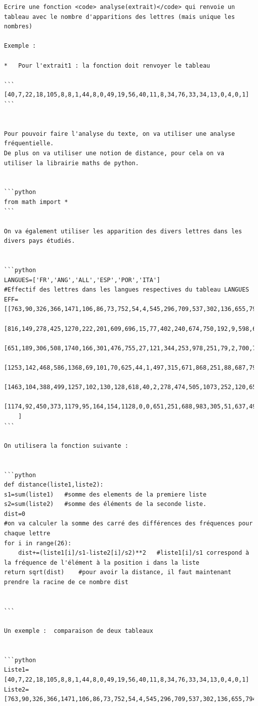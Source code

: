 \documentclass[
]{article}
\begin{document}
\begin{verbatim}
Ecrire une fonction <code> analyse(extrait)</code> qui renvoie un tableau avec le nombre d'apparitions des lettres (mais unique les nombres)

Exemple : 

*   Pour l'extrait1 : la fonction doit renvoyer le tableau   

```
[40,7,22,18,105,8,8,1,44,8,0,49,19,56,40,11,8,34,76,33,34,13,0,4,0,1]
```


Pour pouvoir faire l'analyse du texte, on va utiliser une analyse fréquentielle.  
De plus on va utiliser une notion de distance, pour cela on va utiliser la librairie maths de python.


```python
from math import *
```

On va également utiliser les apparition des divers lettres dans les divers pays étudiés.


```python
LANGUES=['FR','ANG','ALL','ESP','POR','ITA']
#Effectif des lettres dans les langues respectives du tableau LANGUES
EFF=[[763,90,326,366,1471,106,86,73,752,54,4,545,296,709,537,302,136,655,794,724,631,162,11,38,30,13],
    [816,149,278,425,1270,222,201,609,696,15,77,402,240,674,750,192,9,598,632,905,275,97,236,15,197,7],
    [651,189,306,508,1740,166,301,476,755,27,121,344,253,978,251,79,2,700,727,615,435,67,189,3,4,113],
    [1253,142,468,586,1368,69,101,70,625,44,1,497,315,671,868,251,88,687,798,463,393,90,2,22,90,52],
    [1463,104,388,499,1257,102,130,128,618,40,2,278,474,505,1073,252,120,653,781,474,463,167,1,21,1,47],
    [1174,92,450,373,1179,95,164,154,1128,0,0,651,251,688,983,305,51,637,498,562,301,210,0,0,0,49]
    ]
```

On utilisera la fonction suivante : 


```python
def distance(liste1,liste2):
s1=sum(liste1)   #somme des elements de la premiere liste
s2=sum(liste2)   #somme des éléments de la seconde liste.
dist=0
#on va calculer la somme des carré des différences des fréquences pour chaque lettre
for i in range(26):
    dist+=(liste1[i]/s1-liste2[i]/s2)**2   #liste1[i]/s1 correspond à la fréquence de l'élément à la position i dans la liste
return sqrt(dist)    #pour avoir la distance, il faut maintenant prendre la racine de ce nombre dist
                

```

Un exemple :  comparaison de deux tableaux 


```python
Liste1=[40,7,22,18,105,8,8,1,44,8,0,49,19,56,40,11,8,34,76,33,34,13,0,4,0,1]
Liste2=[763,90,326,366,1471,106,86,73,752,54,4,545,296,709,537,302,136,655,794,724,631,162,11,38,30,13]


\end{verbatim}
\end{document}
